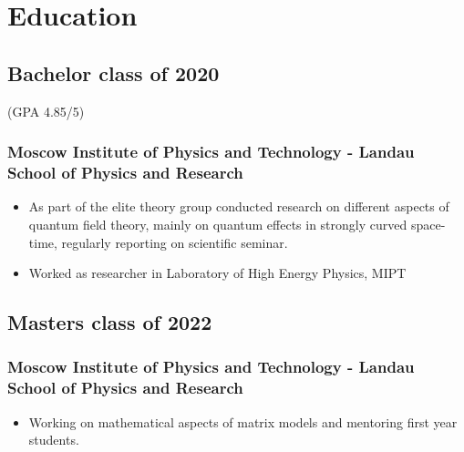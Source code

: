 \documentclass{article}
\newcommand{\datedsubsection}[2]{%
	\subsection[#1]{#1 \hfill #2}%
}
\begin{document}
\section{Education} 
\datedsubsection{Bachelor}{class of 2020} (GPA 4.85/5)
\subsubsection{Moscow Institute of Physics and Technology - Landau School of Physics and Research}

\begin{itemize}
	\item As part of the elite theory group conducted research on different aspects of quantum field theory, mainly on quantum effects in strongly curved space-time, regularly reporting on scientific seminar.  
	\item Worked as researcher in Laboratory of High Energy Physics, MIPT

\end{itemize}

\datedsubsection{Masters }{class of 2022}
\subsubsection{Moscow Institute of Physics and Technology - Landau School of Physics and Research}

\begin{itemize}
	\item Working on mathematical aspects of matrix models and mentoring first year students.

\end{itemize}
\end{document}
